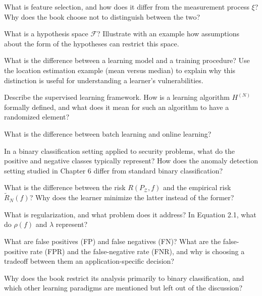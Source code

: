 \documentclass[10pt]{extarticle}
\begin{document}
\begin{questoes}
\item What is feature selection, and how does it differ from the measurement process $\xi$? Why does the book choose not to distinguish between the two?

\item What is a hypothesis space $\mathcal{F}$? Illustrate with an example how assumptions about the form of the hypotheses can restrict this space.

\item What is the difference between a learning model and a training procedure? Use the location estimation example (mean versus median) to explain why this distinction is useful for understanding a learner's vulnerabilities.

\item Describe the supervised learning framework. How is a learning algorithm $H^{(N)}$ formally defined, and what does it mean for such an algorithm to have a randomized element?

\item What is the difference between batch learning and online learning?

\item In a binary classification setting applied to security problems, what do the positive and negative classes typically represent? How does the anomaly detection setting studied in Chapter 6 differ from standard binary classification?

\item What is the difference between the risk $R(P_{\mathcal{Z}}, f)$ and the empirical risk $\tilde{R}_N(f)$? Why does the learner minimize the latter instead of the former?

\item What is regularization, and what problem does it address? In Equation 2.1, what do $\rho(f)$ and $\lambda$ represent?

\item What are false positives (FP) and false negatives (FN)? What are the false-positive rate (FPR) and the false-negative rate (FNR), and why is choosing a tradeoff between them an application-specific decision?

\item Why does the book restrict its analysis primarily to binary classification, and which other learning paradigms are mentioned but left out of the discussion?

\end{questoes}
\end{document}
